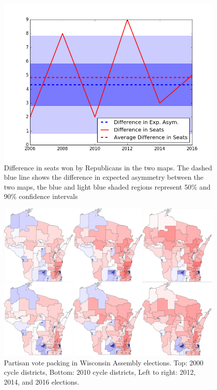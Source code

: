 \documentclass[preprint,12pt]{article}
\begin{document}
\begin{figure}[htb!]
    \begin{center}
        \includegraphics[scale=0.85]{../Figures/WI2010/WI_2000_2010diff.png}
        \caption{Difference in seats won by Republicans in the two maps. The dashed blue line shows the difference in expected asymmetry between the two maps, the blue and light blue shaded regions represent 50\% and 90\% confidence intervals}\label{fig:Asym20002010diff}
    \end{center}
\end{figure}

\begin{figure}[htb!]
    \begin{center}
        \includegraphics[scale=0.25]{../Figures/WI_compared/3x2.png}
        \caption{Partisan vote packing in Wisconsin Assembly elections. Top: 2000 cycle districts, Bottom: 2010 cycle districts, Left to right: 2012, 2014, and 2016 elections.}\label{fig:DistrictMaps}
    \end{center}
\end{figure}
\end{document}
